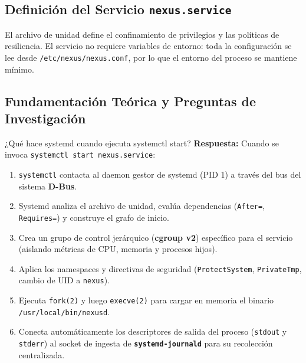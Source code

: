 \documentclass[10pt,a4paper]{article}
\begin{document}
\subsection{Definición del Servicio \texttt{nexus.service}}

El archivo de unidad define el confinamiento de privilegios y las políticas de resiliencia. El servicio no requiere variables de entorno: toda la configuración se lee desde \texttt{/etc/nexus/nexus.conf}, por lo que el entorno del proceso se mantiene mínimo.


\subsection{Fundamentación Teórica y Preguntas de Investigación}

\begin{pregunta}{¿Qué hace systemd cuando ejecuta systemctl start?}
    \textbf{Respuesta:} Cuando se invoca \texttt{systemctl start nexus.service}:
    \begin{enumerate}[leftmargin=*]
        \item \texttt{systemctl} contacta al daemon gestor de systemd (PID 1) a través del bus del sistema \textbf{D-Bus}.
        \item Systemd analiza el archivo de unidad, evalúa dependencias (\texttt{After=}, \texttt{Requires=}) y construye el grafo de inicio.
        \item Crea un grupo de control jerárquico (\textbf{cgroup v2}) específico para el servicio (aislando métricas de CPU, memoria y procesos hijos).
        \item Aplica los namespaces y directivas de seguridad (\texttt{ProtectSystem}, \texttt{PrivateTmp}, cambio de UID a \texttt{nexus}).
        \item Ejecuta \texttt{fork(2)} y luego \texttt{execve(2)} para cargar en memoria el binario \texttt{/usr/local/bin/nexusd}.
        \item Conecta automáticamente los descriptores de salida del proceso (\texttt{stdout} y \texttt{stderr}) al socket de ingesta de \textbf{\texttt{systemd-journald}} para su recolección centralizada.
    \end{enumerate}
\end{pregunta}
\end{document}
